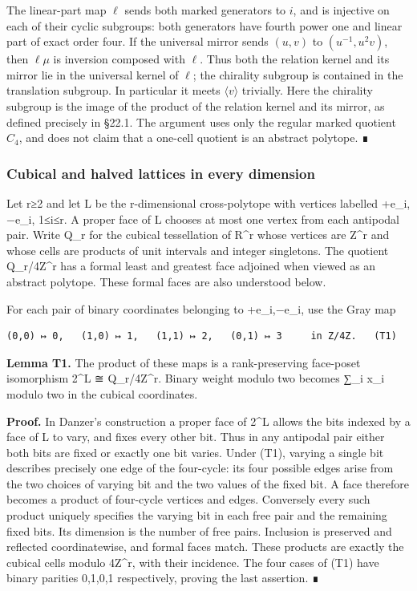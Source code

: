 \documentclass[
  10pt,
  letterpaper,
]{article}
\begin{document}
The linear-part map \(\ell\) sends both marked generators to \(i\), and
is injective on each of their cyclic subgroups: both generators have
fourth power one and linear part of exact order four. If the universal
mirror sends \((u,v)\) to \((u^{-1},u^2v)\), then \(\ell\mu\) is
inversion composed with \(\ell\). Thus both the relation kernel and its
mirror lie in the universal kernel of \(\ell\); the chirality subgroup
is contained in the translation subgroup. In particular it meets
\(\langle v\rangle\) trivially. Here the chirality subgroup is the image
of the product of the relation kernel and its mirror, as defined
precisely in §22.1. The argument uses only the regular marked quotient
\(C_4\), and does not claim that a one-cell quotient is an abstract
polytope. ∎

\subsubsection{Cubical and halved lattices in every
dimension}\label{cubical-and-halved-lattices-in-every-dimension}

Let r≥2 and let L be the r-dimensional cross-polytope with vertices
labelled +e\_i,−e\_i, 1≤i≤r. A proper face of L chooses at most one
vertex from each antipodal pair. Write Q\_r for the cubical tessellation
of R\^{}r whose vertices are Z\^{}r and whose cells are products of unit
intervals and integer singletons. The quotient Q\_r/4Z\^{}r has a formal
least and greatest face adjoined when viewed as an abstract polytope.
These formal faces are also understood below.

For each pair of binary coordinates belonging to +e\_i,−e\_i, use the
Gray map

\begin{verbatim}
(0,0) ↦ 0,   (1,0) ↦ 1,   (1,1) ↦ 2,   (0,1) ↦ 3     in Z/4Z.   (T1)
\end{verbatim}

\textbf{Lemma T1.} The product of these maps is a rank-preserving
face-poset isomorphism 2\^{}L ≅ Q\_r/4Z\^{}r. Binary weight modulo two
becomes ∑\_i x\_i modulo two in the cubical coordinates.

\textbf{Proof.} In Danzer's construction a proper face of 2\^{}L allows
the bits indexed by a face of L to vary, and fixes every other bit. Thus
in any antipodal pair either both bits are fixed or exactly one bit
varies. Under (T1), varying a single bit describes precisely one edge of
the four-cycle: its four possible edges arise from the two choices of
varying bit and the two values of the fixed bit. A face therefore
becomes a product of four-cycle vertices and edges. Conversely every
such product uniquely specifies the varying bit in each free pair and
the remaining fixed bits. Its dimension is the number of free pairs.
Inclusion is preserved and reflected coordinatewise, and formal faces
match. These products are exactly the cubical cells modulo 4Z\^{}r, with
their incidence. The four cases of (T1) have binary parities 0,1,0,1
respectively, proving the last assertion. ∎
\end{document}
